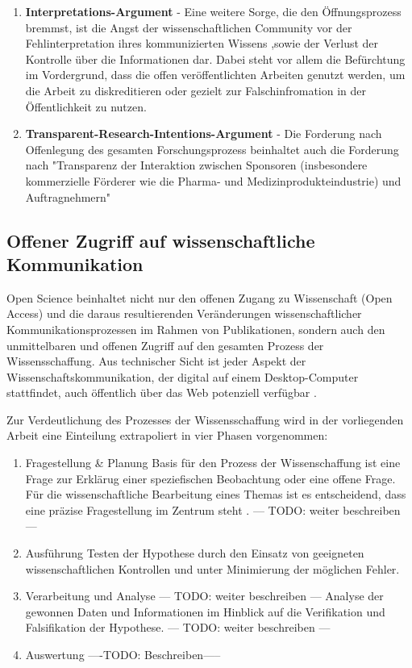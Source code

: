 \begin{enumerate}
\item \textbf{Interpretations-Argument} - Eine weitere Sorge, die den Öffnungsprozess bremmst, ist die Angst der wissenschaftlichen Community vor der Fehlinterpretation ihres kommunizierten Wissens ,sowie der Verlust der Kontrolle über die Informationen\cite{gibbons_1994} dar. Dabei steht vor allem die Befürchtung im Vordergrund, dass die offen veröffentlichten Arbeiten genutzt werden, um die Arbeit zu diskreditieren oder gezielt zur Falschinfromation in der Öffentlichkeit zu nutzen.
\item \textbf{Transparent-Research-Intentions-Argument} - Die Forderung nach Offenlegung des gesamten Forschungsprozess beinhaltet auch die Forderung nach "Transparenz der Interaktion zwischen Sponsoren (insbesondere kommerzielle Förderer wie die Pharma- und Medizinprodukteindustrie) und Auftragnehmern" \cite{Stengel_2013} 
\end{enumerate}

\subsection{Offener Zugriff auf wissenschaftliche Kommunikation}
Open Science beinhaltet nicht nur den offenen Zugang zu Wissenschaft (Open Access) und die daraus resultierenden Veränderungen wissenschaftlicher Kommunikationsprozessen im Rahmen von Publikationen, sondern auch den unmittelbaren und offenen Zugriff auf den gesamten Prozess der Wissensschaffung. Aus technischer Sicht ist jeder Aspekt der Wissenschaftskommunikation, der digital auf einem Desktop-Computer stattfindet, auch öffentlich über das Web potenziell verfügbar \cite{mietchen2012wissenschaft}. 

Zur Verdeutlichung des Prozesses der Wissensschaffung wird in der vorliegenden Arbeit eine Einteilung extrapoliert in vier Phasen vorgenommen:
\begin{enumerate}
\item Fragestellung & Planung
Basis für den Prozess der Wissenschaffung ist eine Frage zur Erklärug einer speziefischen Beobachtung oder eine offene Frage\cite{suchen}. Für die wissenschaftliche Bearbeitung eines Themas ist es entscheidend, dass eine präzise Fragestellung im Zentrum steht \cite{suchen}. --- TODO: weiter beschreiben ---
\item Ausführung
Testen der Hypothese durch den Einsatz von geeigneten wissenschaftlichen Kontrollen und unter Minimierung der möglichen Fehler.
\item Verarbeitung und Analyse --- TODO: weiter beschreiben ---
Analyse der gewonnen Daten und Informationen im Hinblick auf die Verifikation und Falsifikation der Hypothese. --- TODO: weiter beschreiben ---
\item Auswertung
----TODO: Beschreiben-----
\end{enumerate}

